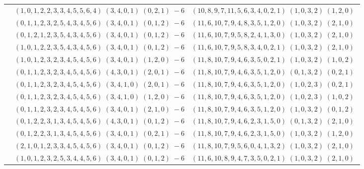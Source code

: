 \documentclass[11pt]{article}
\begin{document}
\begin{longtable}[l]{|c|c|c|}
 \cline{2-3} 
 & $(1 ,0 ,1 ,2 ,2 ,3 ,3 ,4 ,5 ,5 ,6 ,4) \;(3 ,4 ,0 ,1) \;(0 ,2 ,1) \;-6$ & $(10 ,8 ,9 ,7 ,11 ,5 ,6 ,3 ,4 ,0 ,2 ,1) \;(1 ,0 ,3 ,2) \;(1 ,2 ,0) \;$\\ 
 \cline{2-3} 
 & $(0 ,1 ,1 ,2 ,3 ,2 ,5 ,4 ,3 ,4 ,5 ,6) \;(3 ,4 ,0 ,1) \;(0 ,1 ,2) \;-6$ & $(11 ,6 ,10 ,7 ,9 ,4 ,8 ,3 ,5 ,1 ,2 ,0) \;(1 ,0 ,3 ,2) \;(2 ,1 ,0) \;$\\ 
 \cline{2-3} 
 & $(0 ,1 ,2 ,1 ,2 ,3 ,5 ,4 ,3 ,4 ,5 ,6) \;(3 ,4 ,0 ,1) \;(0 ,1 ,2) \;-6$ & $(11 ,6 ,10 ,7 ,9 ,5 ,8 ,2 ,4 ,1 ,3 ,0) \;(1 ,0 ,3 ,2) \;(2 ,1 ,0) \;$\\ 
 \cline{2-3} 
 & $(1 ,0 ,1 ,2 ,2 ,3 ,5 ,4 ,3 ,4 ,5 ,6) \;(3 ,4 ,0 ,1) \;(0 ,1 ,2) \;-6$ & $(11 ,6 ,10 ,7 ,9 ,5 ,8 ,3 ,4 ,0 ,2 ,1) \;(1 ,0 ,3 ,2) \;(2 ,1 ,0) \;$\\ 
 \cline{2-3} 
 & $(1 ,0 ,1 ,2 ,3 ,2 ,3 ,4 ,5 ,4 ,5 ,6) \;(3 ,4 ,0 ,1) \;(1 ,2 ,0) \;-6$ & $(11 ,8 ,10 ,7 ,9 ,4 ,6 ,3 ,5 ,0 ,2 ,1) \;(1 ,0 ,3 ,2) \;(1 ,0 ,2) \;$\\ 
 \cline{2-3} 
 & $(0 ,1 ,1 ,2 ,3 ,2 ,3 ,4 ,5 ,4 ,5 ,6) \;(4 ,3 ,0 ,1) \;(2 ,0 ,1) \;-6$ & $(11 ,8 ,10 ,7 ,9 ,4 ,6 ,3 ,5 ,1 ,2 ,0) \;(0 ,1 ,3 ,2) \;(0 ,2 ,1) \;$\\ 
 \cline{2-3} 
 & $(0 ,1 ,1 ,2 ,3 ,2 ,3 ,4 ,5 ,4 ,5 ,6) \;(3 ,4 ,1 ,0) \;(2 ,0 ,1) \;-6$ & $(11 ,8 ,10 ,7 ,9 ,4 ,6 ,3 ,5 ,1 ,2 ,0) \;(1 ,0 ,2 ,3) \;(0 ,2 ,1) \;$\\ 
 \cline{2-3} 
 & $(0 ,1 ,1 ,2 ,3 ,2 ,3 ,4 ,5 ,4 ,5 ,6) \;(3 ,4 ,1 ,0) \;(1 ,2 ,0) \;-6$ & $(11 ,8 ,10 ,7 ,9 ,4 ,6 ,3 ,5 ,1 ,2 ,0) \;(1 ,0 ,2 ,3) \;(1 ,0 ,2) \;$\\ 
 \cline{2-3} 
 & $(0 ,1 ,1 ,2 ,3 ,2 ,3 ,4 ,5 ,4 ,5 ,6) \;(3 ,4 ,0 ,1) \;(2 ,1 ,0) \;-6$ & $(11 ,8 ,10 ,7 ,9 ,4 ,6 ,3 ,5 ,1 ,2 ,0) \;(1 ,0 ,3 ,2) \;(0 ,1 ,2) \;$\\ 
 \cline{2-3} 
 & $(0 ,1 ,2 ,2 ,3 ,1 ,3 ,4 ,5 ,4 ,5 ,6) \;(4 ,3 ,0 ,1) \;(0 ,1 ,2) \;-6$ & $(11 ,8 ,10 ,7 ,9 ,4 ,6 ,2 ,3 ,1 ,5 ,0) \;(0 ,1 ,3 ,2) \;(2 ,1 ,0) \;$\\ 
 \cline{2-3} 
 & $(0 ,1 ,2 ,2 ,3 ,1 ,3 ,4 ,5 ,4 ,5 ,6) \;(3 ,4 ,0 ,1) \;(0 ,2 ,1) \;-6$ & $(11 ,8 ,10 ,7 ,9 ,4 ,6 ,2 ,3 ,1 ,5 ,0) \;(1 ,0 ,3 ,2) \;(1 ,2 ,0) \;$\\ 
 \cline{2-3} 
 & $(2 ,1 ,0 ,1 ,2 ,3 ,3 ,4 ,5 ,4 ,5 ,6) \;(3 ,4 ,0 ,1) \;(0 ,1 ,2) \;-6$ & $(11 ,8 ,10 ,7 ,9 ,5 ,6 ,0 ,4 ,1 ,3 ,2) \;(1 ,0 ,3 ,2) \;(2 ,1 ,0) \;$\\ 
 \cline{2-3} 
 & $(1 ,0 ,1 ,2 ,3 ,2 ,5 ,3 ,4 ,4 ,5 ,6) \;(3 ,4 ,0 ,1) \;(0 ,1 ,2) \;-6$ & $(11 ,6 ,10 ,8 ,9 ,4 ,7 ,3 ,5 ,0 ,2 ,1) \;(1 ,0 ,3 ,2) \;(2 ,1 ,0) \;$\\ 

\end{longtable}
\end{document}
